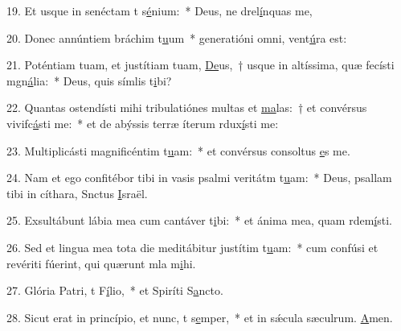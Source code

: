 19. Et usque in senéctam t s\uline{é}nium:~* Deus, ne drel\uline{í}nquas me,\par 
20. Donec annúntiem bráchim t\uline{u}um~* generatióni omni,  vent\uline{ú}ra est:\par 
21. Poténtiam tuam, et justítiam tuam, \uline{De}us,~† usque in altíssima, quæ fecísti mgn\uline{á}lia:~* Deus, quis símlis t\uline{i}bi?\par 
22. Quantas ostendísti mihi tribulatiónes multas et \uline{ma}las:~† et convérsus vivifc\uline{á}sti me:~* et de abýssis terræ íterum rdux\uline{í}sti me:\par 
23. Multiplicásti magnificéntim t\uline{u}am:~* et convérsus consoltus \uline{e}s me.\par 
24. Nam et ego confitébor tibi in vasis psalmi veritátm t\uline{u}am:~* Deus, psallam tibi in cíthara, Snctus \uline{I}sraël.\par 
25. Exsultábunt lábia mea cum cantáver t\uline{i}bi:~* et ánima mea, quam rdem\uline{í}sti.\par 
26. Sed et lingua mea tota die meditábitur justítim t\uline{u}am:~* cum confúsi et revériti fúerint, qui quærunt mla m\uline{i}hi.\par 
27. Glória Patri, t F\uline{í}lio,~* et Spiríti S\uline{a}ncto.\par 
28. Sicut erat in princípio, et nunc, t s\uline{e}mper,~* et in sǽcula sæculrum. \uline{A}men.\par 
